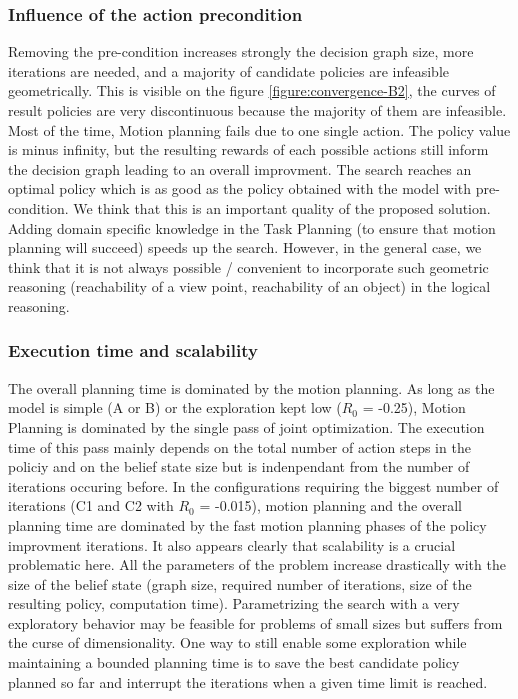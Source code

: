 \documentclass[conference]{IEEEtran}
\begin{document}
\subsubsection{Influence of the action precondition} Removing the pre-condition increases strongly the decision graph size, more iterations are needed, and a majority of candidate policies are infeasible geometrically. This is visible on the figure \ref{figure:convergence-B2}, the curves of result policies are very discontinuous because the majority of them are infeasible. Most of the time, Motion planning fails due to one single action. The policy value is minus infinity, but the resulting rewards of each possible actions still inform the decision graph leading to an overall improvment. The search reaches an optimal policy which is as good as the policy obtained with the model with pre-condition. We think that this is an important quality of the proposed solution. Adding domain specific knowledge in the Task Planning (to ensure that motion planning will succeed) speeds up the search. However, in the general case, we think that it is not always possible / convenient to incorporate such geometric reasoning (reachability of a view point, reachability of an object) in the logical reasoning. 

\subsubsection{Execution time and scalability}
The overall planning time is dominated by the motion planning. As long as the model is simple (A or B) or the exploration kept low ($R_0$ = -0.25), Motion Planning is dominated by the single pass of joint optimization. The execution time of this pass mainly depends on the total number of action steps in the policiy and on the belief state size but is indenpendant from the number of iterations occuring before. In the configurations requiring the biggest number of iterations (C1 and C2 with $R_0$ = -0.015), motion planning and the overall planning time are dominated by the fast motion planning phases of the policy improvment iterations. It also appears clearly that scalability is a crucial problematic here. All the parameters of the problem increase drastically with the size of the belief state (graph size, required number of iterations, size of the resulting policy, computation time). Parametrizing the search with a very exploratory behavior may be feasible for problems of small sizes but suffers from the curse of dimensionality. One way to still enable some exploration while maintaining a bounded planning time is to save the best candidate policy planned so far and interrupt the iterations when a given time limit is reached.
\end{document}
